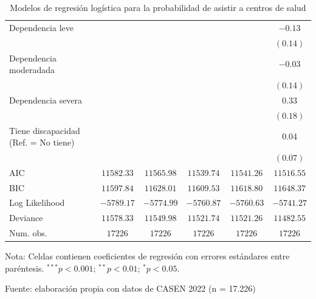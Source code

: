 \documentclass[
  12pt,
  a4paper,
]{article}
\begin{document}
\begin{table}[h!]
\begin{center}
{\begin{threeparttable}
\begin{tabular}{l c c c c c}
\quad Dependencia leve                     &              &              &               &               & $-0.13$       \\
                                           &              &              &               &               & $(0.14)$      \\
\quad Dependencia moderadada               &              &              &               &               & $-0.03$       \\
                                           &              &              &               &               & $(0.14)$      \\
Dependencia severa                         &              &              &               &               & $0.33$        \\
                                           &              &              &               &               & $(0.18)$      \\
Tiene discapacidad (Ref. = No tiene)       &              &              &               &               & $0.04$        \\
                                           &              &              &               &               & $(0.07)$      \\
\midrule
AIC                                        & $11582.33$   & $11565.98$   & $11539.74$    & $11541.26$    & $11516.55$    \\
BIC                                        & $11597.84$   & $11628.01$   & $11609.53$    & $11618.80$    & $11648.37$    \\
Log Likelihood                             & $-5789.17$   & $-5774.99$   & $-5760.87$    & $-5760.63$    & $-5741.27$    \\
Deviance                                   & $11578.33$   & $11549.98$   & $11521.74$    & $11521.26$    & $11482.55$    \\
Num. obs.                                  & $17226$      & $17226$      & $17226$       & $17226$       & $17226$       \\
\bottomrule
\end{tabular}
\begin{tablenotes}[flushleft]
\scriptsize{\item Nota: Celdas contienen coeficientes de regresión con errores estándares entre paréntesis. $^{***}p<0.001$; $^{**}p<0.01$; $^{*}p<0.05$. \\ \item Fuente: elaboración propia con datos de CASEN 2022 (n = 17.226)}
\end{tablenotes}
\end{threeparttable}
}
\caption{\label{tab:table2} Modelos de regresión logística para la probabilidad de asistir a centros de salud}
\label{table:coefficients}
\end{center}
\end{table}
\end{document}
